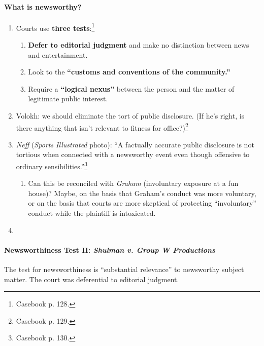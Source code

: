 \paragraph{What is newsworthy?}
\label{par:newsworthiness}

\begin{enumerate}
    \item Courts use \textbf{three tests}:\footnote{Casebook p. 128.}
    \begin{enumerate}
        \item \textbf{Defer to editorial judgment} and make no distinction 
        between news and entertainment.
        \item Look to the \textbf{``customs and conventions of the community.''}
        \item Require a \textbf{``logical nexus''} between the person and the 
        matter of legitimate public interest.
    \end{enumerate}
    \item Volokh: we should eliminate the tort of public disclosure. (If he's 
    right, is there anything that isn't relevant to fitness for 
    office?)\footnote{Casebook p. 129.}
    \item \emph{Neff} (\emph{Sports Illustrated} photo): ``A factually accurate 
    public disclosure is not tortious when connected with a newsworthy event 
    even though offensive to ordinary sensibilities.''\footnote{Casebook p.  
    130.}
    \begin{enumerate}
        \item Can this be reconciled with \emph{Graham} (involuntary exposure at 
        a fun house)? Maybe, on the basis that Graham's conduct was more 
        voluntary, or on the basis that courts are more skeptical of protecting
        ``involuntary'' conduct while the plaintiff is intoxicated.
    \end{enumerate}
    \item
\end{enumerate}

\paragraph{Newsworthiness Test II: \emph{Shulman v. Group W Productions}}
\label{par:shulman-newsworthiness}

The test for newsworthiness is ``substantial relevance'' to newsworthy subject 
matter. The court was deferential to editorial judgment.


